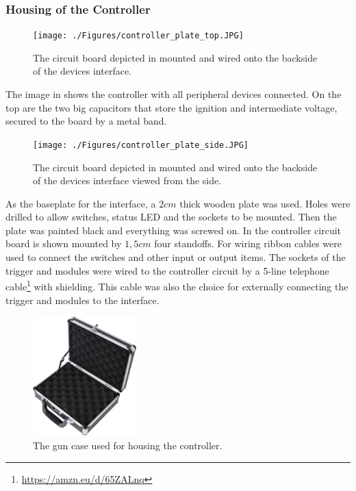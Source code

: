 \pagebreak

\subsubsection{Housing of the Controller}
\label{Housing of the Controller}

\begin{figure}[!ht]
    \centering
    \texttt{[image: ./Figures/controller\_plate\_top.JPG]}
    \caption{ The circuit board depicted in  mounted and wired onto the backside of the devices interface. }
    \label{fig:controller_plate_top}     
\end{figure}

\noindent The image in  shows the controller with all peripheral devices connected. On the top are the two big capacitors that store the ignition and intermediate voltage, secured to the board by a metal band.\\

\begin{figure}[!ht]
    \centering
    \texttt{[image: ./Figures/controller\_plate\_side.JPG]}
    \caption{ The circuit board depicted in  mounted and wired onto the backside of the devices interface viewed from the side. }
    \label{fig:controller_plate_side}     
\end{figure}

\noindent As the baseplate for the interface, a $2cm$ thick wooden plate was used. Holes were drilled to allow switches, status LED and the sockets to be mounted. Then the plate was painted black and everything was screwed on. In  the controller circuit board is shown mounted by $1,5cm$ four standoffs. For wiring ribbon cables  were used to connect the switches and other input or output items. The sockets of the trigger and modules were wired to the controller circuit by a 5-line telephone cable\footnote{\url{https://amzn.eu/d/65ZALnq}} with shielding. This cable was also the choice for externally connecting the trigger and modules to the interface.   

\pagebreak

\begin{figure}[!ht]
    \centering
    \includegraphics[width=4cm]{./Figures/gn_case.jpg}
    \caption{ The gun case used for housing the controller. }
    \label{fig:gn_case}     
\end{figure}

